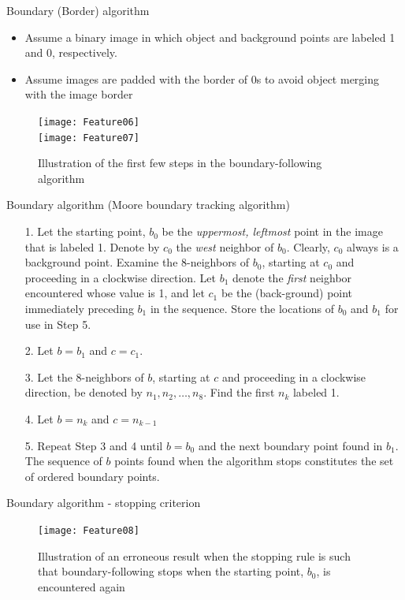 \begin{frame}{Boundary (Border) algorithm}
\begin{itemize}
\item Assume a binary image in which object and background points are labeled 1 and 0, respectively.
\item Assume images are padded with the border of 0s to avoid object merging with the image border
\end{itemize}
\begin{figure}
\texttt{[image: Feature06]}\\
\texttt{[image: Feature07]}
\caption{Illustration of the first few steps in the {\color{maroon}boundary-following algorithm}}
\end{figure}
\end{frame}

\begin{frame}{Boundary algorithm (Moore boundary tracking algorithm)}
\begin{footnotesize}
\begin{itemize}
\item[1.] Let the starting point, $b_0$ be the \textit{uppermost, leftmost} point in the image that is labeled 1. Denote by $c_0$ the \textit{west} neighbor of $b_0$.
Clearly, $c_0$ always is a background point. Examine the 8-neighbors of $b_0$, starting at $c_0$ and proceeding in a clockwise direction. Let $b_1$ denote
the \textit{first} neighbor encountered whose value is 1, and let $c_1$ be the (back-ground) point immediately preceding $b_1$ in the sequence. Store the locations of $b_0$ and $b_1$ for use in Step 5.
\item[2.] Let $b=b_1$ and $c=c_1$.
\item[3.] Let the 8-neighbors of $b$, starting at $c$ and proceeding in a clockwise direction, be denoted by $n_1,n_2,\ldots,n_8$. Find the first $n_k$ labeled 1.
\item[4.] Let $b=n_k$ and $c=n_{k-1}$
\item[5.] Repeat Step 3 and 4 until $b=b_0$ and the next boundary point found in $b_1$. The sequence of $b$ points found when the algorithm stops constitutes the set of ordered boundary points.
\end{itemize}
\end{footnotesize}
\end{frame}

\begin{frame}{Boundary algorithm - stopping criterion}
\begin{figure}
\texttt{[image: Feature08]}
\caption{Illustration of an erroneous result when the stopping rule is such that boundary-following stops when the starting point, $b_0$, is encountered again}
\end{figure}
\end{frame}

